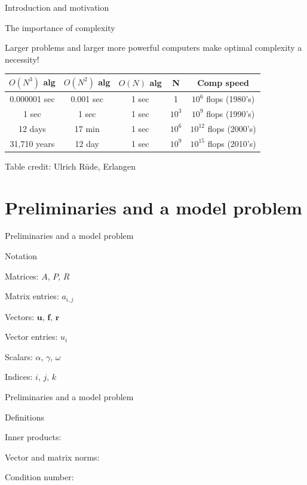 \documentclass[18pt,xcolor=table]{beamer}
\begin{document}
\begin{frame}{Introduction and motivation}
\begin{block}{The importance of complexity}
\bit
\item Larger problems and larger more powerful computers make optimal complexity a necessity!
\eit
\begin{table}
\begin{tabular}{c | c | c | c | c}
$O(N^3)$ alg & $O(N^2)$ alg & $O(N)$ alg & N & Comp speed \\
\hline
0.000001 sec &  0.001 sec & 1 sec & 1 & $10^6$ flops (1980's) \\
1 sec &  1 sec & 1 sec & $10^3$ & $10^9$ flops (1990's) \\
12 days &  17 min & 1 sec & $10^6$ & $10^{12}$ flops (2000's) \\
31,710 years &  12 day & 1 sec & $10^9$ & $10^{15}$ flops (2010's)
\end{tabular}
\end{table}
\end{block}
\tiny{Table credit: Ulrich R\"ude, Erlangen}
\end{frame}



\section{Preliminaries and a model problem}

\begin{frame}{Preliminaries and a model problem}
\begin{block}{Notation}
\bit
\item Matrices: $A$, $P$, $R$
\item Matrix entries: $a_{i,j}$
\item Vectors: $\mathbf{u}$, $\mathbf{f}$, $\mathbf{r}$
\item Vector entries: $u_i$
\item Scalars: $\alpha$, $\gamma$, $\omega$
\item Indices: $i$, $j$, $k$
\eit
\end{block}
\end{frame}

\begin{frame}{Preliminaries and a model problem}
\begin{block}{Definitions}
\bit
\item Inner products: 
\item Vector and matrix norms: 
\item Condition number:
\eit
\end{block}
\end{frame}
\end{document}
